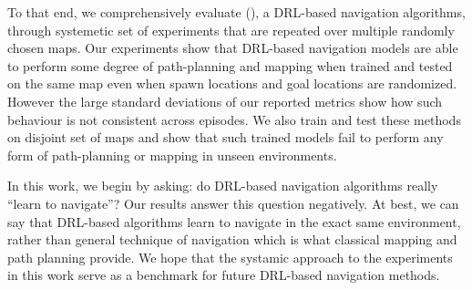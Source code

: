 To that end, we comprehensively evaluate  \NavAiiiCDiDiiL{} (\cite{MiPaViICLR2017}), a DRL-based navigation algorithms, through systemetic set of experiments that
are repeated over multiple randomly chosen maps.
Our experiments show that DRL-based navigation models are able to perform some degree of path-planning and mapping when trained and tested on the same map even when spawn locations and goal locations are randomized. 
However the large standard deviations of our reported metrics show how such behaviour is not consistent across episodes. 
We also train and test these methods on disjoint set of maps and show that such trained models fail to perform any form of path-planning or mapping in unseen environments.

In this work, we begin by asking: do DRL-based navigation algorithms really ``learn to navigate''?
Our results answer this question negatively. At best, we can say that DRL-based algorithms learn to navigate in the exact same environment, rather than general technique of navigation which is what classical mapping and path planning provide.
We hope that the systamic approach to the experiments in this work serve as a benchmark for future DRL-based navigation methods.


